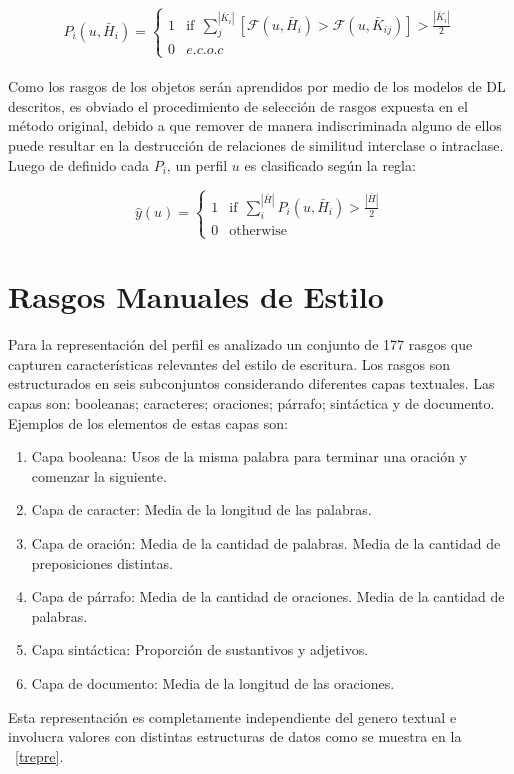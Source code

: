 	\begin{equation*}
	 	P_i(u,  \bar{H}_i) = 
	 	\begin{cases}
	 		1 & \text{if}~~ \sum\limits_{j}^{|\bar{K}_{i}|}[\mathcal{F}(u, \bar{H}_i) > \mathcal{F}(u, \bar{K}_{ij})] > \frac{|\bar{K}_{i}|}{2}\\
	 		0 & e.c.o.c
	 	\end{cases}
	 \end{equation*}	  
	 \\
	 Como los rasgos de los objetos serán aprendidos por medio de los modelos de DL descritos, es obviado el procedimiento de selección de rasgos expuesta en el método original, debido a que remover de manera indiscriminada alguno de ellos puede resultar en la destrucción de relaciones de similitud interclase o intraclase.
	 \\
	 Luego de definido cada $P_i$, un perfil $u$ es clasificado según la regla:
	 
	\begin{equation*}
	 	\hat{y}(u)  = 
	 	\begin{cases}
	 		1 & \text{if}~~ \sum\limits_{i}^{|\bar{H}|} P_i(u, \bar{H}_i) > \frac{|\bar{H}|}{2}\\
	 		0 & \text{otherwise}
	 	\end{cases}
	 \end{equation*}	
	 
	 
	 \section{Rasgos Manuales de Estilo}
	 
	 Para la representación del perfil es analizado un conjunto de 177 rasgos que capturen características relevantes del estilo de escritura. Los rasgos son estructurados en seis subconjuntos considerando diferentes capas textuales. Las capas son: booleanas; caracteres; oraciones; párrafo; sintáctica y de documento.
	 \\
	 Ejemplos de los elementos de estas capas son:	 \\
	 \begin{enumerate}
	 	\item Capa booleana: Usos de la misma palabra para terminar una oración y comenzar la siguiente.
	 	\item Capa de caracter: Media de la longitud de las palabras.
	 	\item Capa de oración: Media de la cantidad de palabras. Media de la cantidad de preposiciones distintas.
	 	\item Capa de párrafo: Media de la cantidad de oraciones. Media de la cantidad de palabras.
	 	\item Capa sintáctica: Proporción de sustantivos y adjetivos.
	 	\item Capa de documento: Media de la longitud de las oraciones.
	 \end{enumerate}
	 Esta representación es completamente independiente del genero textual e involucra valores con distintas estructuras de datos como se muestra en la \figurename~\ref{trepre}.

